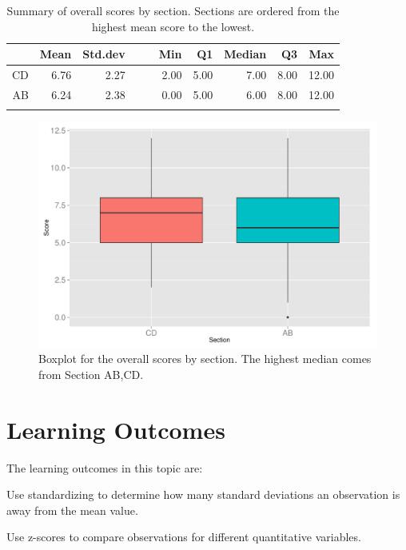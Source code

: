 \documentclass[12pt,nohyper]{tufte-handout}\usepackage[]{graphicx}\usepackage[]{color}
\begin{document}
\begin{longtable}{rrrrrrrrrr}
  \hline
 & Mean & Std.dev &   &   & Min & Q1 & Median & Q3 & Max \\ 
  \hline
CD & 6.76 & 2.27 &  &  & 2.00 & 5.00 & 7.00 & 8.00 & 12.00 \\ 
  AB & 6.24 & 2.38 &  &  & 0.00 & 5.00 & 6.00 & 8.00 & 12.00 \\ 
   \hline
\hline
\caption{Summary of overall scores by section. Sections are ordered from the highest mean score to the lowest.} 
\label{tab:summary}
\end{longtable}
\begin{center}
\begin{figure}
\begin{centering}
\includegraphics[width=0.8\linewidth]{Topic06_boxplot_score}
\par\end{centering}
\caption{\label{fig:boxplot-score}Boxplot for the overall scores by section. The highest median comes from Section AB,CD.}
\end{figure}\par\end{center}


\clearpage
\newpage{}
\section{Learning Outcomes}

\bigskip{}

The learning outcomes in this topic are:

\bigskip{}
Use standardizing to determine how many standard deviations an observation is away from the mean value.

 \bigskip{} 

Use z-scores to compare observations for different quantitative variables.
\end{document}
